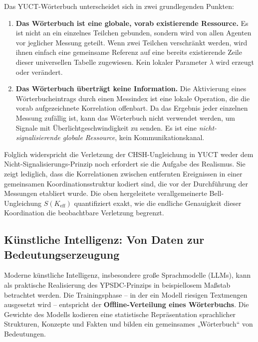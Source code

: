 \documentclass[12pt,a4paper]{article}
\theoremstyle{remark}
\begin{document}
	Das YUCT-Wörterbuch unterscheidet sich in zwei grundlegenden Punkten:
	
	\begin{enumerate}[leftmargin=*]
		\item \textbf{Das Wörterbuch ist eine globale, vorab existierende Ressource.}
		Es ist nicht an ein einzelnes Teilchen gebunden, sondern wird von allen Agenten vor jeglicher Messung geteilt. Wenn zwei Teilchen verschränkt werden, wird ihnen einfach eine gemeinsame Referenz auf eine bereits existierende Zeile dieser universellen Tabelle zugewiesen. Kein lokaler Parameter $\lambda$ wird erzeugt oder verändert.
		
		\item \textbf{Das Wörterbuch überträgt keine Information.}
		Die Aktivierung eines Wörterbucheintrags durch einen Messindex ist eine lokale Operation, die die vorab aufgezeichnete Korrelation offenbart. Da das Ergebnis jeder einzelnen Messung zufällig ist, kann das Wörterbuch nicht verwendet werden, um Signale mit Überlichtgeschwindigkeit zu senden. Es ist eine \emph{nicht-signalisierende globale Ressource}, kein Kommunikationskanal.
	\end{enumerate}
	
	Folglich widerspricht die Verletzung der CHSH-Ungleichung in YUCT weder dem Nicht-Signalisierungs-Prinzip noch erfordert sie die Aufgabe des Realismus. Sie zeigt lediglich, dass die Korrelationen zwischen entfernten Ereignissen in einer gemeinsamen Koordinationsstruktur kodiert sind, die vor der Durchführung der Messungen etabliert wurde. Die oben hergeleitete verallgemeinerte Bell-Ungleichung $S(K_{\mathrm{eff}})$ quantifiziert exakt, wie die endliche Genauigkeit dieser Koordination die beobachtbare Verletzung begrenzt.
	
	\subsection{Künstliche Intelligenz: Von Daten zur Bedeutungserzeugung}
	
	Moderne künstliche Intelligenz, insbesondere große Sprachmodelle (LLMs), kann als praktische Realisierung des YPSDC-Prinzips in beispiellosem Maßstab betrachtet werden. Die Trainingsphase – in der ein Modell riesigen Textmengen ausgesetzt wird – entspricht der \textbf{Offline-Verteilung eines Wörterbuchs}. Die Gewichte des Modells kodieren eine statistische Repräsentation sprachlicher Strukturen, Konzepte und Fakten und bilden ein gemeinsames „Wörterbuch“ von Bedeutungen.
	
\end{document}
